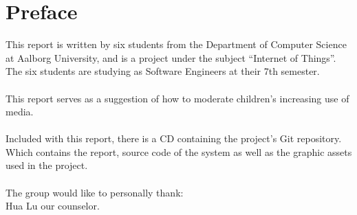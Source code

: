 \chapter*{Preface}
\label{chap:preface}
This report is written by six students from the Department of Computer Science at Aalborg University, and is a project under the subject ``Internet of Things''. The six students are studying as Software Engineers at their 7th semester.\\
\\
This report serves as a suggestion of how to moderate children's increasing use of media.\\
\\
Included with this report, there is a CD containing the project's Git repository. Which contains the report, source code of the system as well as the graphic assets used in the project.\\
\\
The group would like to personally thank:\\
Hua Lu our counselor.
